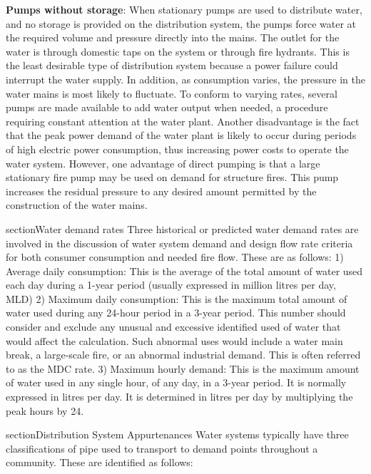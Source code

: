 \textbf{Pumps without storage}: When stationary pumps are used to distribute water, and no storage
is provided on the distribution system, the pumps force water at the required volume and pressure
directly into the mains. The outlet for the water is through domestic taps on the system or 
through fire hydrants. This is the least desirable type of distribution system because a power 
failure could interrupt the water supply. In addition, as consumption varies, the pressure in the
water mains is most likely to fluctuate. To conform to varying rates, several pumps are made 
available to add water output when needed, a procedure requiring constant attention at the water
plant. Another disadvantage is the fact that the peak power demand of the water plant is likely
to occur during periods of high electric power consumption, thus increasing power costs to operate
the water system. However, one advantage of direct pumping is that a large stationary fire pump 
may be used on demand for structure fires. This pump increases the residual pressure to any 
desired amount permitted by the construction of the water mains.

section{Water demand rates}
Three historical or predicted water demand rates are involved in the discussion of water system demand and design flow rate criteria for both consumer consumption and needed fire flow. These are as follows:
1) Average daily consumption: This is the average of the total amount of water used each day during a 1-year period (usually expressed in million litres per day, MLD)
2) Maximum daily consumption: This is the maximum total amount of water used during any 24-hour period in a 3-year period. This number should consider and exclude any unusual and excessive identified used of water that would affect the calculation. Such abnormal uses would include a water main break, a large-scale fire, or an abnormal industrial demand. This is often referred to as the MDC rate.
3) Maximum hourly demand: This is the maximum amount of water used in any single hour, of any day, in a 3-year period. It is normally expressed in litres per day. It is determined in litres per day by multiplying the peak hours by 24. 

section{Distribution System Appurtenances}
Water systems typically have three classifications of pipe used to transport to demand points 
throughout a community. These are identified as follows:
\bigbreak

